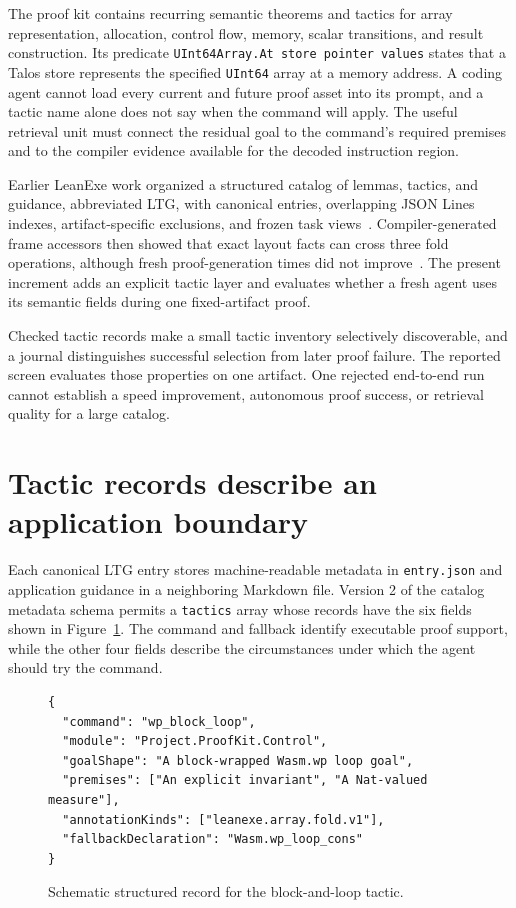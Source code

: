 \documentclass[10pt]{article}
\newcommand{\code}[1]{\texttt{#1}}
\begin{document}
The proof kit contains recurring semantic theorems and tactics for array representation, allocation, control flow, memory, scalar transitions, and result construction.  Its predicate \code{UInt64Array.At store pointer values} states that a Talos store represents the specified \code{UInt64} array at a memory address.  A coding agent cannot load every current and future proof asset into its prompt, and a tactic name alone does not say when the command will apply.  The useful retrieval unit must connect the residual goal to the command's required premises and to the compiler evidence available for the decoded instruction region.

Earlier LeanExe work organized a structured catalog of lemmas, tactics, and guidance, abbreviated LTG, with canonical entries, overlapping JSON Lines indexes, artifact-specific exclusions, and frozen task views~\cite{LeanExeStructuredLTG}.  Compiler-generated frame accessors then showed that exact layout facts can cross three fold operations, although fresh proof-generation times did not improve~\cite{LeanExeFrameAccessors}.  The present increment adds an explicit tactic layer and evaluates whether a fresh agent uses its semantic fields during one fixed-artifact proof.

Checked tactic records make a small tactic inventory selectively discoverable, and a journal distinguishes successful selection from later proof failure.  The reported screen evaluates those properties on one artifact.  One rejected end-to-end run cannot establish a speed improvement, autonomous proof success, or retrieval quality for a large catalog.

\section{Tactic records describe an application boundary}

Each canonical LTG entry stores machine-readable metadata in \code{entry.json} and application guidance in a neighboring Markdown file.  Version 2 of the catalog metadata schema permits a \code{tactics} array whose records have the six fields shown in Figure~\ref{fig:record}.  The command and fallback identify executable proof support, while the other four fields describe the circumstances under which the agent should try the command.

\begin{figure}[t]
\centering
\begin{minipage}{0.89\linewidth}
\begin{verbatim}
{
  "command": "wp_block_loop",
  "module": "Project.ProofKit.Control",
  "goalShape": "A block-wrapped Wasm.wp loop goal",
  "premises": ["An explicit invariant", "A Nat-valued measure"],
  "annotationKinds": ["leanexe.array.fold.v1"],
  "fallbackDeclaration": "Wasm.wp_loop_cons"
}
\end{verbatim}
\end{minipage}
\caption{Schematic structured record for the block-and-loop tactic.}
\label{fig:record}
\end{figure}
\end{document}

